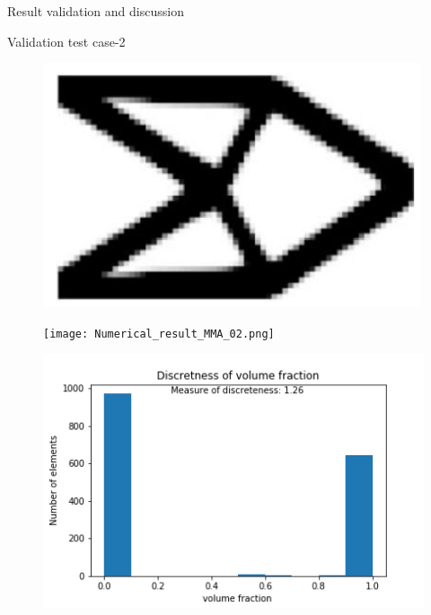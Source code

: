 \documentclass[a4paper,12pt,times]{article}
\begin{document}
\begin{section}{Result validation and discussion}
\begin{subsection}{Validation test case-2}
\begin{figure}[H]
	\centering
	\begin{minipage}{.5\textwidth}
		\centering
		\includegraphics[width=1\linewidth]{analytical_OC_2.png}
		\label{VC-03.1}
	\end{minipage}%
	\begin{minipage}{.5\textwidth}
		\centering
		\texttt{[image: Numerical\_result\_MMA\_02.png]}
		\label{VC-03.2}
	\end{minipage}
\end{figure} 
\begin{figure}[H]
	\centering
	\begin{minipage}{.5\textwidth}
		\centering
		\includegraphics[width=1\linewidth]{MMA_02_discretness.png}

\end{minipage}
\end{figure}
\end{subsection}
\end{section}
\end{document}
